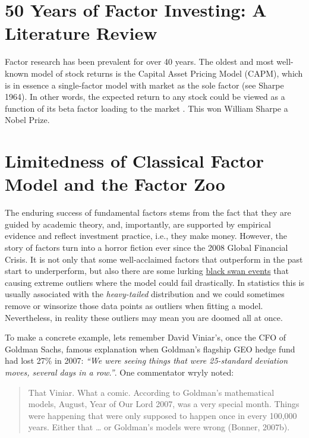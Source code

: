 \documentclass[
]{book}
\begin{document}
\hypertarget{years-of-factor-investing-a-literature-review}{%
\section{50 Years of Factor Investing: A Literature Review}\label{years-of-factor-investing-a-literature-review}}

Factor research has been prevalent for over 40 years. The oldest and most well-known model of stock returns is the Capital Asset Pricing Model (CAPM), which is in essence a single-factor model with market as the sole factor (see Sharpe 1964). In other words, the expected return to any stock could be viewed as a function of its beta factor loading to the market . This won William Sharpe a Nobel Prize.

\hypertarget{limitedness-of-classical-factor-model-and-the-factor-zoo}{%
\section{Limitedness of Classical Factor Model and the Factor Zoo}\label{limitedness-of-classical-factor-model-and-the-factor-zoo}}

The enduring success of fundamental factors stems from the fact that they are guided by academic theory, and, importantly, are supported by empirical evidence and reflect investment practice, i.e., they make money. However, the story of factors turn into a horror fiction ever since the 2008 Global Financial Crisis. It is not only that some well-acclaimed factors that outperform in the past start to underperform, but also there are some lurking \href{https://en.wikipedia.org/wiki/Black_swan_theory}{black swan events} that causing extreme outliers where the model could fail drastically. In statistics this is usually associated with the {\emph{heavy-tailed}} distribution and we could sometimes remove or winsorize those data points as outliers when fitting a model. Nevertheless, in reality these outliers may mean you are doomed all at once.

To make a concrete example, lets remember David Viniar's, once the CFO of Goldman Sachs, famous explanation when Goldman's flagship GEO hedge fund had lost 27\% in 2007: \emph{``We were seeing things that were 25-standard deviation moves, several days in a row.''}. One commentator wryly noted:

\begin{quote}
That Viniar. What a comic. According to Goldman's mathematical models, August, Year of Our Lord 2007, was a very special month. Things were happening that were only supposed to happen once in every 100,000 years. Either that \ldots{} or Goldman's models were wrong (Bonner, 2007b).
\end{quote}
\end{document}
